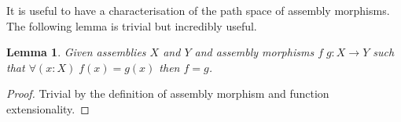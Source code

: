 \documentclass{article}
\newtheorem{lemma}[theorem]{Lemma}
\theoremstyle{plain}
\theoremstyle{remark}
\begin{document}
It is useful to have a characterisation of the path space of assembly morphisms. The following
lemma is trivial but incredibly useful.

\begin{lemma}
  Given assemblies $X$ and $Y$ and assembly morphisms $f \; g : X \to Y$ such that $\forall (x : X)\; f(x) = g(x)$ then $f = g$.
\end{lemma}
\begin{proof}
  Trivial by the definition of assembly morphism and function extensionality.
\end{proof}



\end{document}
